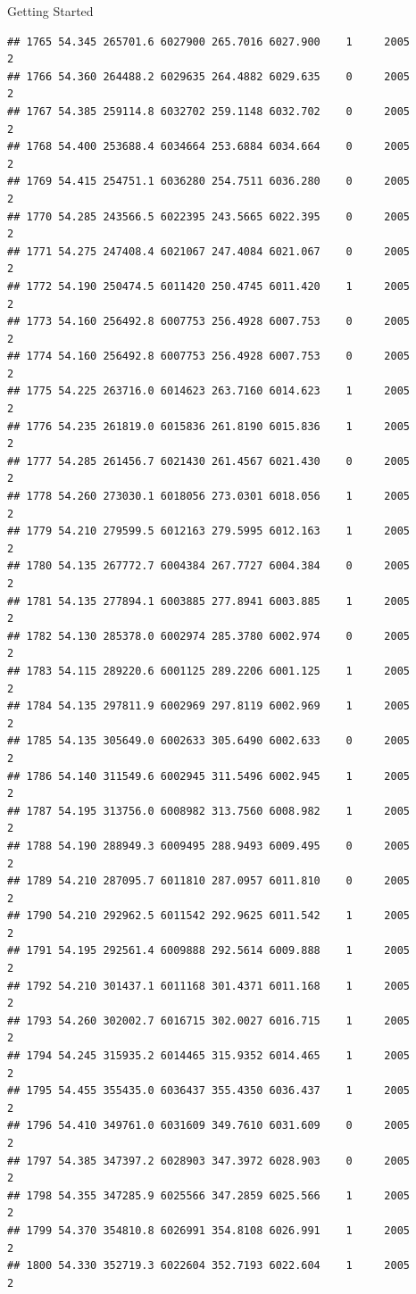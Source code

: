 \documentclass[
  ignorenonframetext,
]{beamer}
\begin{document}
\begin{frame}[fragile]{Getting Started}
\begin{verbatim}
## 1765 54.345 265701.6 6027900 265.7016 6027.900    1     2005        2
## 1766 54.360 264488.2 6029635 264.4882 6029.635    0     2005        2
## 1767 54.385 259114.8 6032702 259.1148 6032.702    0     2005        2
## 1768 54.400 253688.4 6034664 253.6884 6034.664    0     2005        2
## 1769 54.415 254751.1 6036280 254.7511 6036.280    0     2005        2
## 1770 54.285 243566.5 6022395 243.5665 6022.395    0     2005        2
## 1771 54.275 247408.4 6021067 247.4084 6021.067    0     2005        2
## 1772 54.190 250474.5 6011420 250.4745 6011.420    1     2005        2
## 1773 54.160 256492.8 6007753 256.4928 6007.753    0     2005        2
## 1774 54.160 256492.8 6007753 256.4928 6007.753    0     2005        2
## 1775 54.225 263716.0 6014623 263.7160 6014.623    1     2005        2
## 1776 54.235 261819.0 6015836 261.8190 6015.836    1     2005        2
## 1777 54.285 261456.7 6021430 261.4567 6021.430    0     2005        2
## 1778 54.260 273030.1 6018056 273.0301 6018.056    1     2005        2
## 1779 54.210 279599.5 6012163 279.5995 6012.163    1     2005        2
## 1780 54.135 267772.7 6004384 267.7727 6004.384    0     2005        2
## 1781 54.135 277894.1 6003885 277.8941 6003.885    1     2005        2
## 1782 54.130 285378.0 6002974 285.3780 6002.974    0     2005        2
## 1783 54.115 289220.6 6001125 289.2206 6001.125    1     2005        2
## 1784 54.135 297811.9 6002969 297.8119 6002.969    1     2005        2
## 1785 54.135 305649.0 6002633 305.6490 6002.633    0     2005        2
## 1786 54.140 311549.6 6002945 311.5496 6002.945    1     2005        2
## 1787 54.195 313756.0 6008982 313.7560 6008.982    1     2005        2
## 1788 54.190 288949.3 6009495 288.9493 6009.495    0     2005        2
## 1789 54.210 287095.7 6011810 287.0957 6011.810    0     2005        2
## 1790 54.210 292962.5 6011542 292.9625 6011.542    1     2005        2
## 1791 54.195 292561.4 6009888 292.5614 6009.888    1     2005        2
## 1792 54.210 301437.1 6011168 301.4371 6011.168    1     2005        2
## 1793 54.260 302002.7 6016715 302.0027 6016.715    1     2005        2
## 1794 54.245 315935.2 6014465 315.9352 6014.465    1     2005        2
## 1795 54.455 355435.0 6036437 355.4350 6036.437    1     2005        2
## 1796 54.410 349761.0 6031609 349.7610 6031.609    0     2005        2
## 1797 54.385 347397.2 6028903 347.3972 6028.903    0     2005        2
## 1798 54.355 347285.9 6025566 347.2859 6025.566    1     2005        2
## 1799 54.370 354810.8 6026991 354.8108 6026.991    1     2005        2
## 1800 54.330 352719.3 6022604 352.7193 6022.604    1     2005        2

\end{verbatim}
\end{frame}
\end{document}

